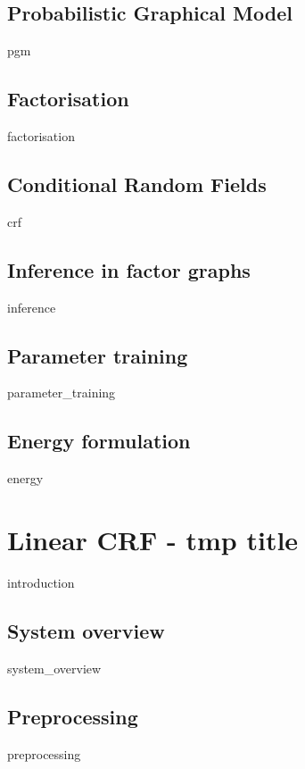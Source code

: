 \documentclass[12pt]{report}
\begin{document}
\section{Probabilistic Graphical Model}
{pgm}

\section{Factorisation}
{factorisation}

\section{Conditional Random Fields }
{crf}
	
\section{Inference in factor graphs}
\label{sec:inference}
{inference}

\section{Parameter training }
{parameter_training}

\section{Energy formulation}	
\label{sec:energy}
{energy}

\chapter{Linear CRF - tmp title}
\label{chapter:linear}
{introduction}

\section{System overview}	
{system_overview}

\section{Preprocessing}	
\label{sec:linear_preprocessing}
{preprocessing}
\end{document}

